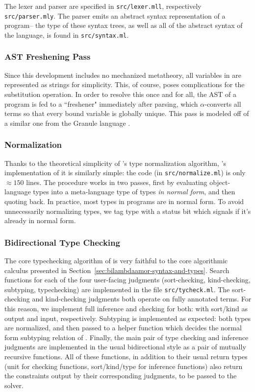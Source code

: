 The lexer and parser are specified in \texttt{src/lexer.mll}, respectively \texttt{src/parser.mly}. The parser emits an abstract syntax representation of a program-- the type of these syntax trees, as well as all of the abstract syntax of the language, is found in \texttt{src/syntax.ml}.


\subsubsection{AST Freshening Pass}
Since this development includes no mechanized metatheory, all variables in \lambdaamorimpl are represented as strings for simplicity. This, of course, poses complications for the substitution operation. In order to resolve this once and for all, the AST of a program is fed to a ``freshener" immediately after parsing, which $\alpha$-converts all terms so that every bound variable is globally unique. This pass is modeled off of a similar one from the Granule language \cite{orchard-et-al:popl19}.

\subsubsection{Normalization}
Thanks to the theoretical simplicity of \lambdaamor's type normalization algorithm, \lambdaamorimpl's implementation of it is similarly simple: the code (in \texttt{src/normalize.ml}) is only $\approx 150$ lines. The procedure works in two passes, first by evaluating object-language types into a meta-language type of types \textit{in normal form}, and then quoting back. In practice, most types in \lambdaamor programs are in normal form. To avoid unnecessarily normalizing types, we tag type with a status bit which signals if it's already in normal form.

\subsubsection{Bidirectional Type Checking}
The core typechecking algorithm of \lambdaamorimpl is very faithful to the core algorithmic calculus presented in Section~\ref{sec:bilambdaamor-syntax-and-types}. Search functions for each of the four user-facing judgments (sort-checking, kind-checking, subtyping, typechecking) are implemented in the file \texttt{src/tycheck.ml}. The sort-checking and kind-checking judgments both operate on fully annotated terms. For this reason, we implement full inference and checking for both: with sort/kind as output and input, respectively. Subtyping is implemented as expected: both types are normalized, and then passed to a helper function which decides the normal form subtyping relation of \bilambdaamor. Finally, the main pair of type checking and inference judgments are implemented in the usual bidirectional style as a pair of mutually recursive functions. All of these functions, in addition to their usual return types (unit for checking functions, sort/kind/type for inference functions) also return the constraints output by their corresponding judgments, to be passed to the solver.

